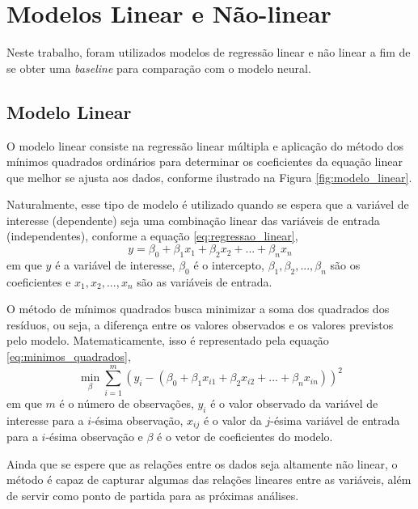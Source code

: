 \section{Modelos Linear e Não-linear}
Neste trabalho, foram utilizados modelos de regressão linear e não linear a fim de se obter uma \textit{baseline} para
comparação com o modelo neural.

\subsection{Modelo Linear}
O modelo linear consiste na regressão linear múltipla e aplicação do método dos mínimos quadrados ordinários para determinar 
os coeficientes da equação linear que melhor se ajusta aos dados, conforme ilustrado na Figura \ref{fig:modelo_linear}.
\begin{figure}[!ht]
	{}
	{}
\end{figure}

Naturalmente, esse tipo de modelo é utilizado quando se espera que a variável de interesse (dependente) seja uma combinação linear
das variáveis de entrada (independentes), conforme a equação \ref{eq:regressao_linear},
\begin{equation}
\label{eq:regressao_linear}
y = \beta_0 + \beta_1 x_1 + \beta_2 x_2 + ... + \beta_n x_n
\end{equation}
em que $y$ é a variável de interesse, 
$\beta_0$ é o intercepto, $\beta_1, \beta_2, ..., \beta_n$ são os coeficientes e $x_1, x_2, ..., x_n$ são as variáveis de entrada.

O método de mínimos quadrados busca minimizar a soma dos quadrados dos resíduos, ou seja, a diferença entre os valores
observados e os valores previstos pelo modelo. Matematicamente, isso é representado pela equação \ref{eq:minimos_quadrados},
\begin{equation}
\label{eq:minimos_quadrados}
\min_{\beta} \sum_{i=1}^{m} \left(y_i - (\beta_0 + \beta_1 x_{i1} + \beta_2 x_{i2} + ... + \beta_n x_{in})\right)^2
\end{equation}
em que $m$ é o número de observações, $y_i$ é o valor observado da variável de interesse para a $i$-ésima observação,
$x_{ij}$ é o valor da $j$-ésima variável de entrada para a $i$-ésima observação e $\beta$ é o vetor de coeficientes
do modelo.

Ainda que se espere que as relações entre os dados seja altamente não linear, o método é capaz de capturar algumas
das relações lineares entre as variáveis, além de servir como ponto de partida para as próximas análises.


